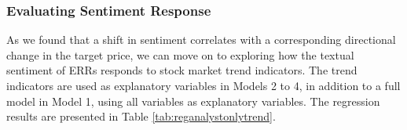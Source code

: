 



\subsubsection{Evaluating Sentiment Response}


As we found that a shift in sentiment correlates with a corresponding directional change in the target price, we can move on to exploring how the textual sentiment of ERRs responds to stock market trend indicators. The trend indicators are used as explanatory variables in Models 2 to 4, in addition to a full model in Model 1, using all variables as explanatory variables. The regression results are presented in Table \ref{tab:reganalystonlytrend}.


